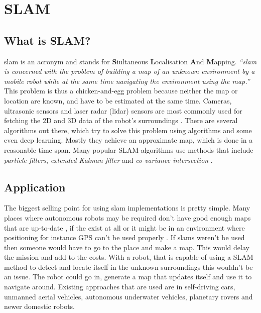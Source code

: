 
\chapter{SLAM\authorA}

\section{What is SLAM?}
\gls{slam} is an acronym and stands for \textbf{S}iultaneous \textbf{L}ocalisation \textbf{A}nd \textbf{M}apping.
\emph{\enquote{\gls{slam} is concerned with the problem of building a map of an unknown environment by a mobile robot while at the same time navigating the environment using the map.}} \cite{slamfordummies} \newline
This problem is thus a chicken-and-egg problem because neither the map or location are known, and have to be estimated at the same time. Cameras, ultrasonic sensors and laser radar (\gls{lidar}) sensors are most commonly used for fetching the 2D and 3D data of the robot's surroundings \cite{arreverie}. \newline
There are several algorithms out there, which try to solve this problem using algorithms and some even deep learning. Mostly they achieve an approximate map, which is done in a reasonable time span. Many popular SLAM-algorithms use methods that include \textit{particle filters}, \textit{extended Kalman filter} and \textit{co-variance intersection}\cite{slamfordummies} \cite{1678144}. \newline

\section{Application}
The biggest selling point for using \gls{slam} implementations is pretty simple. Many places where autonomous robots may be required don't have good enough maps that are up-to-date , if the exist at all or it might be in an environment where positioning for instance GPS can't be used properly \cite{techapeekslam}. If slams weren't be used then someone would have to go to the place and make a map. This would delay the mission and add to the costs. \newline
With a robot, that is capable of using a SLAM method to detect and locate itself in the unknown surroundings this wouldn't be an issue. The robot could go in, generate a map that updates itself and use it to navigate around. \newline
Existing approaches that are used are in self-driving cars, unmanned aerial vehicles, autonomous underwater vehicles, planetary rovers and newer domestic robots.

